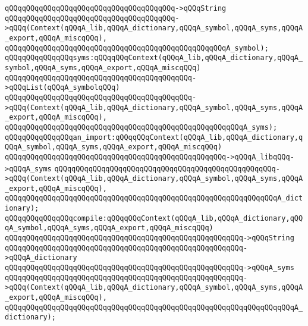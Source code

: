 \verb|qQQqqQQqqQQqqQQqqQQqqQQqqQQqqQQqqQQqqQQq->qQQqString|\newline
\verb|qQQqqQQqqQQqqQQqqQQqqQQqqQQqqQQqqQQqqQQq->qQQq(Context(qQQqA_lib,qQQqA_dictionary,qQQqA_symbol,qQQqA_syms,qQQqA_export,qQQqA_miscqQQq),|\newline
\verb|qQQqqQQqqQQqqQQqqQQqqQQqqQQqqQQqqQQqqQQqqQQqqQQqqQQqA_symbol);|\newline
\newline
\verb|qQQqqQQqqQQqqQQqsyms:qQQqqQQqContext(qQQqA_lib,qQQqA_dictionary,qQQqA_symbol,qQQqA_syms,qQQqA_export,qQQqA_miscqQQq)|\newline
\verb|qQQqqQQqqQQqqQQqqQQqqQQqqQQqqQQqqQQqqQQqqQQq->qQQqList(qQQqA_symbolqQQq)|\newline
\verb|qQQqqQQqqQQqqQQqqQQqqQQqqQQqqQQqqQQqqQQqqQQq->qQQq(Context(qQQqA_lib,qQQqA_dictionary,qQQqA_symbol,qQQqA_syms,qQQqA_export,qQQqA_miscqQQq),|\newline
\verb|qQQqqQQqqQQqqQQqqQQqqQQqqQQqqQQqqQQqqQQqqQQqqQQqqQQqqQQqA_syms);|\newline
\newline
\verb|qQQqqQQqqQQqqQQqan_import:qQQqqQQqContext(qQQqA_lib,qQQqA_dictionary,qQQqA_symbol,qQQqA_syms,qQQqA_export,qQQqA_miscqQQq)|\newline
\verb|qQQqqQQqqQQqqQQqqQQqqQQqqQQqqQQqqQQqqQQqqQQqqQQqqQQq->qQQqA_libqQQq->qQQqA_syms|\newline
\verb|qQQqqQQqqQQqqQQqqQQqqQQqqQQqqQQqqQQqqQQqqQQqqQQqqQQq->qQQq(Context(qQQqA_lib,qQQqA_dictionary,qQQqA_symbol,qQQqA_syms,qQQqA_export,qQQqA_miscqQQq),|\newline
\verb|qQQqqQQqqQQqqQQqqQQqqQQqqQQqqQQqqQQqqQQqqQQqqQQqqQQqqQQqqQQqqQQqA_dictionary);|\newline
\newline
\verb|qQQqqQQqqQQqqQQqcompile:qQQqqQQqContext(qQQqA_lib,qQQqA_dictionary,qQQqA_symbol,qQQqA_syms,qQQqA_export,qQQqA_miscqQQq)|\newline
\verb|qQQqqQQqqQQqqQQqqQQqqQQqqQQqqQQqqQQqqQQqqQQqqQQqqQQqqQQq->qQQqString|\newline
\verb|qQQqqQQqqQQqqQQqqQQqqQQqqQQqqQQqqQQqqQQqqQQqqQQqqQQqqQQq->qQQqA_dictionary|\newline
\verb|qQQqqQQqqQQqqQQqqQQqqQQqqQQqqQQqqQQqqQQqqQQqqQQqqQQqqQQq->qQQqA_syms|\newline
\verb|qQQqqQQqqQQqqQQqqQQqqQQqqQQqqQQqqQQqqQQqqQQqqQQqqQQqqQQq->qQQq(Context(qQQqA_lib,qQQqA_dictionary,qQQqA_symbol,qQQqA_syms,qQQqA_export,qQQqA_miscqQQq),|\newline
\verb|qQQqqQQqqQQqqQQqqQQqqQQqqQQqqQQqqQQqqQQqqQQqqQQqqQQqqQQqqQQqqQQqqQQqA_dictionary);|\newline
